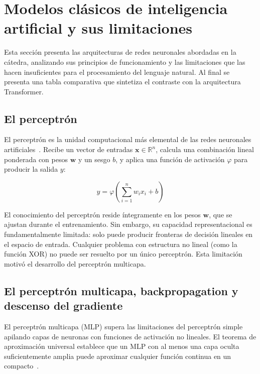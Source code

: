 \section{Modelos clásicos de inteligencia artificial y sus limitaciones}
\label{sec:redes_clasicas}

Esta sección presenta las arquitecturas de redes neuronales abordadas en la
cátedra, analizando sus principios de funcionamiento y las limitaciones que
las hacen insuficientes para el procesamiento del lenguaje natural. Al final
se presenta una tabla comparativa que sintetiza el contraste con la arquitectura
Transformer.

\subsection{El perceptrón}
\label{subsec:perceptron}

El perceptrón es la unidad computacional más elemental de las redes
neuronales artificiales~\cite{goodfellow2016deeplearning}. Recibe un vector
de entradas $\bm{x} \in \mathbb{R}^n$, calcula una combinación lineal
ponderada con pesos $\bm{w}$ y un sesgo $b$, y aplica una función de
activación $\varphi$ para producir la salida $y$:

\begin{equation}
    y = \varphi\!\left(\sum_{i=1}^{n} w_i x_i + b\right)
\end{equation}



El conocimiento del perceptrón reside íntegramente en los pesos $\bm{w}$,
que se ajustan durante el entrenamiento. Sin embargo, su capacidad
representacional es fundamentalmente limitada: solo puede producir
fronteras de decisión lineales en el espacio de entrada. Cualquier problema
con estructura no lineal (como la función XOR) no puede ser resuelto por
un único perceptrón. Esta limitación motivó el desarrollo del perceptrón
multicapa.

\subsection{El perceptrón multicapa, backpropagation y descenso del gradiente}
\label{subsec:mlp}

El perceptrón multicapa (MLP) supera las limitaciones del perceptrón simple
apilando capas de neuronas con funciones de activación no lineales. El teorema
de aproximación universal establece que un MLP con al menos una capa oculta
suficientemente amplia puede aproximar cualquier función continua en un
compacto~\cite{goodfellow2016deeplearning}.

